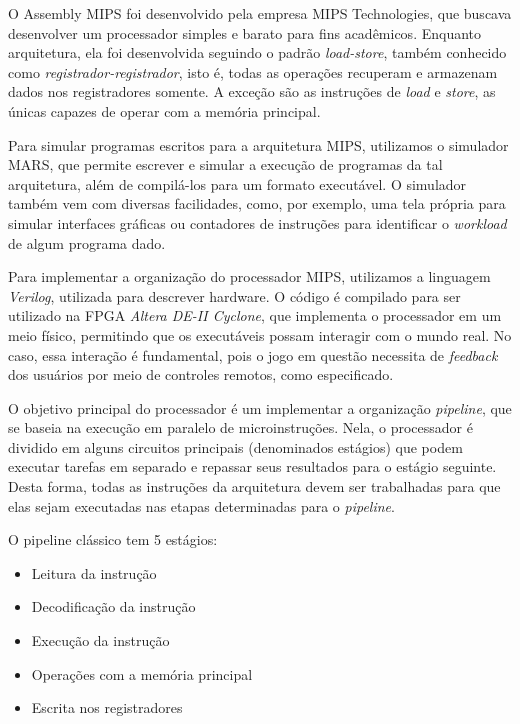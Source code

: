 \documentclass[12pt, a4paper, twocolumn]{article}
\begin{document}
O Assembly MIPS foi desenvolvido pela empresa MIPS Technologies, que buscava desenvolver um processador simples e barato para fins acadêmicos. Enquanto arquitetura, ela foi desenvolvida seguindo o padrão \textit{load-store}, também conhecido como \textit{registrador-registrador}, isto é, todas as operações recuperam e armazenam dados nos registradores somente. A exceção são as instruções de \textit{load} e \textit{store}, as únicas capazes de operar com a memória principal.

Para simular programas escritos para a arquitetura MIPS, utilizamos o simulador MARS, que permite escrever e simular a execução de programas da tal arquitetura, além de compilá-los para um formato executável. O simulador também vem com diversas facilidades, como, por exemplo, uma tela própria para simular interfaces gráficas ou contadores de instruções para identificar o \textit{workload} de algum programa dado.

Para implementar a organização do processador MIPS, utilizamos a linguagem \textit{Verilog}, utilizada para descrever hardware. O código é compilado para ser utilizado na FPGA \textit{Altera DE-II Cyclone}, que implementa o processador em um meio físico, permitindo que os executáveis possam interagir com o mundo real. No caso, essa interação é fundamental, pois o jogo em questão necessita de \textit{feedback} dos usuários por meio de controles remotos, como especificado.

O objetivo principal do processador é um implementar a organização \textit{pipeline}, que se baseia na execução em paralelo de microinstruções. Nela, o processador é dividido em alguns circuitos principais (denominados  estágios) que podem executar tarefas em separado e repassar seus resultados para o estágio seguinte. Desta forma, todas as instruções da arquitetura devem ser trabalhadas para que elas sejam executadas nas etapas determinadas para o \textit{pipeline}.

O pipeline clássico tem 5 estágios:

\begin{itemize}
    \item Leitura da instrução
    \item Decodificação da instrução
    \item Execução da instrução
    \item Operações com a memória principal
    \item Escrita nos registradores
\end{itemize}
\end{document}
